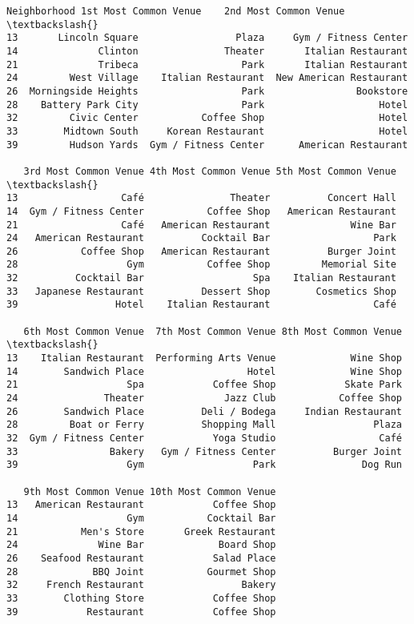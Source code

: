\documentclass[11pt]{article}
\makeatletter
\newcommand{\boxspacing}{\kern\kvtcb@left@rule\kern\kvtcb@boxsep}
\newcommand{\prompt}[4]{
        \ttfamily\llap{{\color{#2}[#3]:\hspace{3pt}#4}}\vspace{-\baselineskip}
    }
\makeatother
\begin{document}
            \begin{tcolorbox}[breakable, size=fbox, boxrule=.5pt, pad at break*=1mm, opacityfill=0]
\prompt{Out}{outcolor}{67}{\boxspacing}
\begin{Verbatim}[commandchars=\\\{\}]
           Neighborhood 1st Most Common Venue    2nd Most Common Venue  \textbackslash{}
13       Lincoln Square                 Plaza     Gym / Fitness Center
14              Clinton               Theater       Italian Restaurant
21              Tribeca                  Park       Italian Restaurant
24         West Village    Italian Restaurant  New American Restaurant
26  Morningside Heights                  Park                Bookstore
28    Battery Park City                  Park                    Hotel
32         Civic Center           Coffee Shop                    Hotel
33        Midtown South     Korean Restaurant                    Hotel
39         Hudson Yards  Gym / Fitness Center      American Restaurant

   3rd Most Common Venue 4th Most Common Venue 5th Most Common Venue  \textbackslash{}
13                  Café               Theater          Concert Hall
14  Gym / Fitness Center           Coffee Shop   American Restaurant
21                  Café   American Restaurant              Wine Bar
24   American Restaurant          Cocktail Bar                  Park
26           Coffee Shop   American Restaurant          Burger Joint
28                   Gym           Coffee Shop         Memorial Site
32          Cocktail Bar                   Spa    Italian Restaurant
33   Japanese Restaurant          Dessert Shop        Cosmetics Shop
39                 Hotel    Italian Restaurant                  Café

   6th Most Common Venue  7th Most Common Venue 8th Most Common Venue  \textbackslash{}
13    Italian Restaurant  Performing Arts Venue             Wine Shop
14        Sandwich Place                  Hotel             Wine Shop
21                   Spa            Coffee Shop            Skate Park
24               Theater              Jazz Club           Coffee Shop
26        Sandwich Place          Deli / Bodega     Indian Restaurant
28         Boat or Ferry          Shopping Mall                 Plaza
32  Gym / Fitness Center            Yoga Studio                  Café
33                Bakery   Gym / Fitness Center          Burger Joint
39                   Gym                   Park               Dog Run

   9th Most Common Venue 10th Most Common Venue
13   American Restaurant            Coffee Shop
14                   Gym           Cocktail Bar
21           Men's Store       Greek Restaurant
24              Wine Bar             Board Shop
26    Seafood Restaurant            Salad Place
28             BBQ Joint           Gourmet Shop
32     French Restaurant                 Bakery
33        Clothing Store            Coffee Shop
39            Restaurant            Coffee Shop
\end{Verbatim}
\end{tcolorbox}
        
\end{document}
